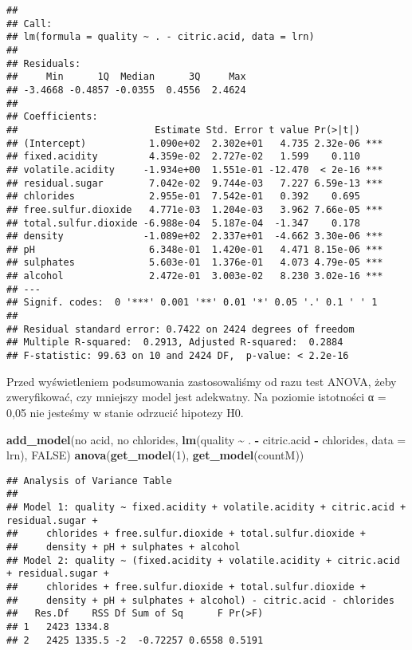 \documentclass[
]{article}
\newenvironment{Shaded}{\begin{snugshade}}{\end{snugshade}}
\newcommand{\AttributeTok}[1]{\textcolor[rgb]{0.13,0.29,0.53}{#1}}
\newcommand{\ConstantTok}[1]{\textcolor[rgb]{0.56,0.35,0.01}{#1}}
\newcommand{\DecValTok}[1]{\textcolor[rgb]{0.00,0.00,0.81}{#1}}
\newcommand{\FunctionTok}[1]{\textcolor[rgb]{0.13,0.29,0.53}{\textbf{#1}}}
\newcommand{\NormalTok}[1]{#1}
\newcommand{\SpecialCharTok}[1]{\textcolor[rgb]{0.81,0.36,0.00}{\textbf{#1}}}
\newcommand{\StringTok}[1]{\textcolor[rgb]{0.31,0.60,0.02}{#1}}
\begin{document}
\begin{verbatim}
## 
## Call:
## lm(formula = quality ~ . - citric.acid, data = lrn)
## 
## Residuals:
##     Min      1Q  Median      3Q     Max 
## -3.4668 -0.4857 -0.0355  0.4556  2.4624 
## 
## Coefficients:
##                        Estimate Std. Error t value Pr(>|t|)    
## (Intercept)           1.090e+02  2.302e+01   4.735 2.32e-06 ***
## fixed.acidity         4.359e-02  2.727e-02   1.599    0.110    
## volatile.acidity     -1.934e+00  1.551e-01 -12.470  < 2e-16 ***
## residual.sugar        7.042e-02  9.744e-03   7.227 6.59e-13 ***
## chlorides             2.955e-01  7.542e-01   0.392    0.695    
## free.sulfur.dioxide   4.771e-03  1.204e-03   3.962 7.66e-05 ***
## total.sulfur.dioxide -6.988e-04  5.187e-04  -1.347    0.178    
## density              -1.089e+02  2.337e+01  -4.662 3.30e-06 ***
## pH                    6.348e-01  1.420e-01   4.471 8.15e-06 ***
## sulphates             5.603e-01  1.376e-01   4.073 4.79e-05 ***
## alcohol               2.472e-01  3.003e-02   8.230 3.02e-16 ***
## ---
## Signif. codes:  0 '***' 0.001 '**' 0.01 '*' 0.05 '.' 0.1 ' ' 1
## 
## Residual standard error: 0.7422 on 2424 degrees of freedom
## Multiple R-squared:  0.2913, Adjusted R-squared:  0.2884 
## F-statistic: 99.63 on 10 and 2424 DF,  p-value: < 2.2e-16
\end{verbatim}

Przed wyświetleniem podsumowania zastosowaliśmy od razu test ANOVA, żeby
zweryfikować, czy mniejszy model jest adekwatny. Na poziomie istotności
α = 0,05 nie jesteśmy w stanie odrzucić hipotezy H0.

\begin{Shaded}
\begin{Highlighting}[]
\FunctionTok{add\_model}\NormalTok{(}\StringTok{\textquotesingle{}no acid, no chlorides\textquotesingle{}}\NormalTok{, }\FunctionTok{lm}\NormalTok{(quality }\SpecialCharTok{\textasciitilde{}}\NormalTok{ . }\SpecialCharTok{{-}}\NormalTok{ citric.acid }\SpecialCharTok{{-}}\NormalTok{ chlorides, }\AttributeTok{data =}\NormalTok{ lrn), }\ConstantTok{FALSE}\NormalTok{)}
\FunctionTok{anova}\NormalTok{(}\FunctionTok{get\_model}\NormalTok{(}\DecValTok{1}\NormalTok{), }\FunctionTok{get\_model}\NormalTok{(countM))}
\end{Highlighting}
\end{Shaded}

\begin{verbatim}
## Analysis of Variance Table
## 
## Model 1: quality ~ fixed.acidity + volatile.acidity + citric.acid + residual.sugar + 
##     chlorides + free.sulfur.dioxide + total.sulfur.dioxide + 
##     density + pH + sulphates + alcohol
## Model 2: quality ~ (fixed.acidity + volatile.acidity + citric.acid + residual.sugar + 
##     chlorides + free.sulfur.dioxide + total.sulfur.dioxide + 
##     density + pH + sulphates + alcohol) - citric.acid - chlorides
##   Res.Df    RSS Df Sum of Sq      F Pr(>F)
## 1   2423 1334.8                           
## 2   2425 1335.5 -2  -0.72257 0.6558 0.5191
\end{verbatim}
\end{document}
